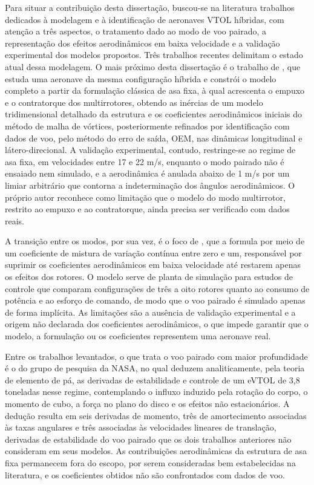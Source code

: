 {\color{blue}
Para situar a contribuição desta dissertação, buscou-se na literatura trabalhos dedicados à modelagem e à identificação de aeronaves VTOL híbridas, com atenção a três aspectos, o tratamento dado ao modo de voo pairado, a representação dos efeitos aerodinâmicos em baixa velocidade e a validação experimental dos modelos propostos. Três trabalhos recentes delimitam o estado atual dessa modelagem. O mais próximo desta dissertação é o trabalho de \textcite{Graesdal2021}, que estuda uma aeronave da mesma configuração híbrida e constrói o modelo completo a partir da formulação clássica de asa fixa, à qual acrescenta o empuxo e o contratorque dos multirrotores, obtendo as inércias de um modelo tridimensional detalhado da estrutura e os coeficientes aerodinâmicos iniciais do método de malha de vórtices, posteriormente refinados por identificação com dados de voo, pelo método do erro de saída, \gls{OEM}, nas dinâmicas longitudinal e látero-direcional. A validação experimental, contudo, restringe-se ao regime de asa fixa, em velocidades entre 17 e 22 m/s, enquanto o modo pairado não é ensaiado nem simulado, e a aerodinâmica é anulada abaixo de 1 m/s por um limiar arbitrário que contorna a indeterminação dos ângulos aerodinâmicos. O próprio autor reconhece como limitação que o modelo do modo multirrotor, restrito ao empuxo e ao contratorque, ainda precisa ser verificado com dados reais.

A transição entre os modos, por sua vez, é o foco de \textcite{Salahudden2023}, que a formula por meio de um coeficiente de mistura de variação contínua entre zero e um, responsável por suprimir os coeficientes aerodinâmicos em baixa velocidade até restarem apenas os efeitos dos rotores. O modelo serve de planta de simulação para estudos de controle que comparam configurações de três a oito rotores quanto ao consumo de potência e ao esforço de comando, de modo que o voo pairado é simulado apenas de forma implícita. As limitações são a ausência de validação experimental e a origem não declarada dos coeficientes aerodinâmicos, o que impede garantir que o modelo, a formulação ou os coeficientes representem uma aeronave real.

Entre os trabalhos levantados, o que trata o voo pairado com maior profundidade é o do grupo de pesquisa da NASA, no qual \textcite{Nguyen2025} deduzem analiticamente, pela teoria de elemento de pá, as derivadas de estabilidade e controle de um eVTOL de 3,8 toneladas nesse regime, contemplando o influxo induzido pela rotação do corpo, o momento de cubo, a força no plano do disco e os efeitos não estacionários. A dedução resulta em seis derivadas de momento, três de amortecimento associadas às taxas angulares e três associadas às velocidades lineares de translação, derivadas de estabilidade do voo pairado que os dois trabalhos anteriores não consideram em seus modelos. As contribuições aerodinâmicas da estrutura de asa fixa permanecem fora do escopo, por serem consideradas bem estabelecidas na literatura, e os coeficientes obtidos não são confrontados com dados de voo.

}
